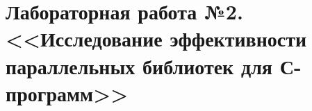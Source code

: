 \section{Лабораторная работа №2. <<Исследование эффективности параллельных библиотек для С-программ>>}




